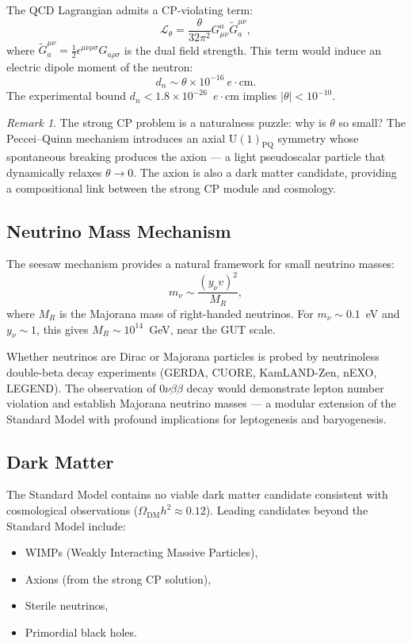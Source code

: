 \documentclass[12pt]{article}
\theoremstyle{definition}
\theoremstyle{remark}
\newtheorem{remark}[theorem]{Remark}
\newcommand{\lag}{\mathcal{L}}
\newcommand{\uu}[1]{\mathrm{U}(#1)}
\begin{document}
The QCD Lagrangian admits a CP-violating term:
\begin{equation}
\lag_\theta = \frac{\theta}{32\pi^2} G^a_{\mu\nu} \tilde{G}_a^{\mu\nu},
\end{equation}
where $\tilde{G}_a^{\mu\nu} = \frac{1}{2} \epsilon^{\mu\nu\rho\sigma} G_{a\rho\sigma}$ is the dual field strength. This term would induce an electric dipole moment of the neutron:
\begin{equation}
d_n \sim \theta \times 10^{-16}~e\cdot\text{cm}.
\end{equation}
The experimental bound $d_n < 1.8 \times 10^{-26}$~$e\cdot$cm implies $|\theta| < 10^{-10}$.

\begin{remark}
The strong CP problem is a naturalness puzzle: why is $\theta$ so small? The Peccei--Quinn mechanism introduces an axial $\uu{1}_{\mathrm{PQ}}$ symmetry whose spontaneous breaking produces the axion --- a light pseudoscalar particle that dynamically relaxes $\theta \to 0$. The axion is also a dark matter candidate, providing a compositional link between the strong CP module and cosmology.
\end{remark}

\subsection{Neutrino Mass Mechanism}

The seesaw mechanism provides a natural framework for small neutrino masses:
\begin{equation}
m_\nu \sim \frac{(y_\nu v)^2}{M_R},
\end{equation}
where $M_R$ is the Majorana mass of right-handed neutrinos. For $m_\nu \sim 0.1$~eV and $y_\nu \sim 1$, this gives $M_R \sim 10^{14}$~GeV, near the GUT scale.

Whether neutrinos are Dirac or Majorana particles is probed by neutrinoless double-beta decay experiments (GERDA, CUORE, KamLAND-Zen, nEXO, LEGEND). The observation of $0\nu\beta\beta$ decay would demonstrate lepton number violation and establish Majorana neutrino masses --- a modular extension of the Standard Model with profound implications for leptogenesis and baryogenesis.

\subsection{Dark Matter}

The Standard Model contains no viable dark matter candidate consistent with cosmological observations ($\Omega_{\mathrm{DM}} h^2 \approx 0.12$). Leading candidates beyond the Standard Model include:
\begin{itemize}
\item WIMPs (Weakly Interacting Massive Particles),
\item Axions (from the strong CP solution),
\item Sterile neutrinos,
\item Primordial black holes.
\end{itemize}
\end{document}
